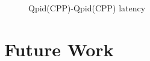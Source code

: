 \documentclass{thesis}
\begin{document}
\begin{figure}[tb] 
\centering
\caption{Qpid(CPP)-Qpid(CPP) latency}
\label{qpid-qpid-latency}
\end{figure}

\chapter{Future Work}

\end{document}
